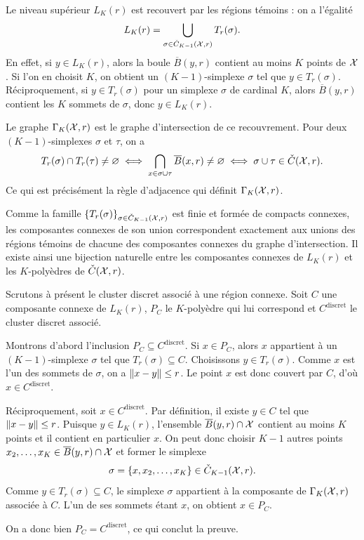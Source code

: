 \begin{Preuve}[{Preuve du \Th~\ref{th:cech_kpolyedres_knn}}]
Le niveau supérieur $L_K(r)$ est recouvert par les régions témoins : on a l'égalité
\[
    L_K(r)=\bigcup_{\sigma\in\check C_{K-1}(\mathcal{X},r)} T_r(\sigma).
\]
En effet, si $y\in L_K(r)$, alors la boule $\overline B(y,r)$ contient au moins $K$ points de $\mathcal{X}$. Si l'on en choisit $K$, on obtient un $(K-1)$-simplexe $\sigma$ tel que $y\in T_r(\sigma)$. Réciproquement, si $y\in T_r(\sigma)$ pour un simplexe $\sigma$ de cardinal $K$, alors $\overline B(y,r)$ contient les $K$ sommets de $\sigma$, donc $y\in L_K(r)$.

Le graphe $\Gamma_K(\mathcal{X},r)$ est le graphe d'intersection de ce recouvrement.
Pour deux $(K-1)$-simplexes $\sigma$ et $\tau$, on a
\[
    T_r(\sigma)\cap T_r(\tau)\neq \varnothing
    \iff \bigcap_{x\in \sigma\cup\tau}\overline B(x,r)\neq \varnothing
    \iff \sigma\cup\tau\in \check C(\mathcal{X},r).
\]
Ce qui est précisément la règle d'adjacence qui définit $\Gamma_K(\mathcal{X},r)$.

Comme la famille $\{T_r(\sigma)\}_{\sigma\in\check C_{K-1}(\mathcal{X},r)}$ est finie et formée de compacts connexes, les composantes connexes de son union correspondent exactement aux unions des régions témoins de chacune des composantes connexes du graphe d'intersection. 
Il existe ainsi une bijection naturelle entre les composantes connexes de $L_K(r)$ et les $K$-polyèdres de $\check C(\mathcal{X},r)$.

Scrutons à présent le cluster discret associé à une région connexe.
Soit $C$ une composante connexe de $L_K(r)$, $P_C$ le $K$-polyèdre qui lui correspond et $C^{\mathrm{discret}}$ le cluster discret associé.

Montrons d'abord l'inclusion $P_C\subseteq C^{\mathrm{discret}}$. Si $x\in P_C$, alors $x$ appartient à un $(K-1)$-simplexe $\sigma$ tel que $T_r(\sigma)\subseteq C$. Choisissons $y\in T_r(\sigma)$. Comme $x$ est l'un des sommets de $\sigma$, on a $\lVert x-y \rVert\le r$. Le point $x$ est donc couvert par $C$, d'où $x\in C^{\mathrm{discret}}$.

Réciproquement, soit $x\in C^{\mathrm{discret}}$. Par définition, il existe $y\in C$ tel que $\lVert x-y \rVert\le r$. Puisque $y\in L_K(r)$, l'ensemble $\overline B(y,r)\cap \mathcal{X}$ contient au moins $K$ points et il contient en particulier $x$. On peut donc choisir $K-1$ autres points $x_2,\ldots,x_K\in \overline B(y,r)\cap \mathcal{X}$ et former le simplexe
\[
    \sigma = \{x,x_2,\ldots,x_K\}\in \check C_{K-1}(\mathcal{X},r).
\]
Comme $y\in T_r(\sigma)\subseteq C$, le simplexe $\sigma$ appartient à la composante de $\Gamma_K(\mathcal{X},r)$ associée à $C$. L'un de ses sommets étant $x$, on obtient $x\in P_C$.

On a donc bien $P_C=C^{\mathrm{discret}}$, ce qui conclut la preuve.
\end{Preuve}

